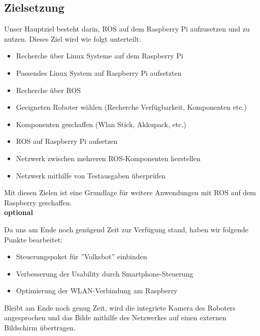 \documentclass[12pt]{article}
\begin{document}



\subsection{Zielsetzung}


Unser Hauptziel besteht darin, ROS auf dem Raspberry Pi aufzusetzen und zu nutzen. Dieses Ziel wird wie folgt unterteilt:\\

\begin{itemize}

\item Recherche über Linux Systeme auf dem Raspberry Pi 
\item Passendes Linux System auf Raspberry Pi aufsetzten			
\item Recherche über ROS
\item Geeigneten Roboter wählen (Recherche Verfügbarkeit, Komponenten etc.)
\item Komponenten geschaffen (Wlan Stick, Akkupack, etc.)
\item ROS auf Raspberry Pi aufsetzen
\item Netzwerk zwischen mehreren ROS-Komponenten herstellen
\item Netzwerk mithilfe von Testausgaben überprüfen

\end{itemize}

Mit diesen Zielen ist eine Grundlage für weitere Anwendungen mit ROS auf dem Raspberry geschaffen.\\

{\bf optional}

Da uns am Ende noch genügend Zeit zur Verfügung stand, haben wir folgende Punkte bearbeitet:

\begin{itemize}

\item Steuerungspaket für ''Volksbot'' einbinden
\item Verbesserung der Usability durch Smartphone-Steuerung
\item Optimierung der WLAN-Verbindung am Raspberry
 
\end{itemize}
Bleibt am Ende noch genug Zeit, wird die integriete Kamera des Roboters angesprochen und das Bilde mithilfe des Netzwerkes auf einen externen Bildschirm übertragen.
\end{document}
